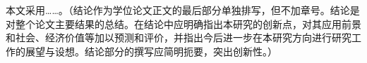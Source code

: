 %
%
%
%

\begin{conclusion}

本文采用……。{\color{blue}（结论作为学位论文正文的最后部分单独排写，但不加章号。结论是对整个论文主要结果的总结。在结论中应明确指出本研究的创新点，对其应用前景和社会、经济价值等加以预测和评价，并指出今后进一步在本研究方向进行研究工作的展望与设想。结论部分的撰写应简明扼要，突出创新性。）}

\end{conclusion}
